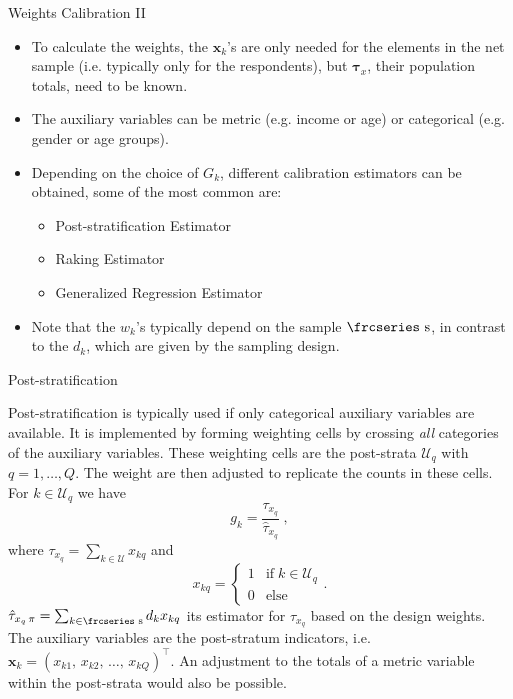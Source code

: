 \documentclass[10pt]{beamer}\usepackage[]{graphicx}\usepackage[]{color}
\newcommand{\textfrc}[1]{{\frcseries#1}}
\newcommand{\mathfrc}[1]{\text{\textfrc{#1}}}
\begin{document}
\begin{frame}{Weights Calibration II}
\begin{itemize}
\item To calculate the weights, the $\mathbf{x}_k$'s are only needed for the elements in the net sample (i.e. typically only for the respondents), but $\boldsymbol{\tau}_x$, their population totals, need to be known.

\item The auxiliary variables can be metric (e.g. income or age) or categorical (e.g. gender or age groups).

\item Depending on the choice of $G_k$, different calibration estimators can be obtained, some of the most common are: \begin{itemize}
\item Post-stratification Estimator
\item Raking Estimator
\item Generalized Regression Estimator
\end{itemize}
 
\item Note that the $w_k$'s typically depend on the sample $\mathfrc{s}$, in contrast to the $d_k$, which are given by the sampling design.

\end{itemize}
\end{frame}

\begin{frame}{Post-stratification}

Post-stratification is typically used if only categorical auxiliary variables are available. It is implemented by forming weighting cells by crossing \emph{all} categories of the auxiliary variables.
These weighting cells are the post-strata $\mathcal{U}_q$ with $q=1,\ldots,Q$.
The weight are then adjusted to replicate the counts in these cells. For $k \in \mathcal{U}_q$  we have
$$g_k = \dfrac{\tau_{x_q}}{\hat{\tau}_{x_q}}\;{,}$$
 where $\tau_{x_q}= \sum_{k \in \mathcal{U}} x_{kq}$ and 
 $$
x_{kq}=
 \begin{cases}
 1 & \text{if}\; k \in \mathcal{U}_q \\
 0 & \text{else}
 \end{cases}.
 $$
 $\hat{\tau}_{x_q\,\pi}=\sum_{k \in \mathfrc{s}} d_k x_{kq}$ its estimator for $\tau_{x_q}$ based on the design weights. The auxiliary variables are the post-stratum indicators, i.e. $\mathbf{x}_k =(x_{k1}{,}\, x_{k2}{,}\,\ldots{,}\,x_{kQ})^\top$.
 An adjustment to the totals of a metric variable within the post-strata would also be possible.


\end{frame}
\end{document}
